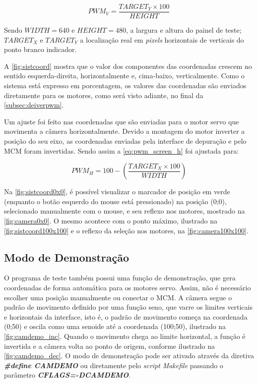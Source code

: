 \begin{equation}
	PWM_V = \frac{TARGET_Y \times 100}{HEIGHT}
	\label{eq:pwm_screen_v}
\end{equation}

Sendo $WIDTH = 640$ e $HEIGHT = 480$, a largura e altura do painel de teste; $TARGET_X$ e $TARGET_Y$ a localização real em \textit{pixels} horizontais de verticais do ponto branco indicador.

A \autoref{fig:sistcoord} mostra que o valor dos componentes das coordenadas crescem no sentido esquerda-direita, horizontalmente e, cima-baixo, verticalmente. Como o sistema está expresso em porcentagem, os valores das coordenadas são enviados diretamente para os motores, como será visto adiante, no final da \autoref{subsec:deiverpwm}.\par

Um ajuste foi feito nas coordenadas que são enviadas para o motor servo que movimenta a câmera horizontalmente. Devido a montagem do motor inverter a posição do seu eixo, as coordenadas enviadas pela interface de depuração e pelo MCM foram invertidas. Sendo assim a \autoref{eq:pwm_screen_h} foi ajustada para:

\begin{equation}
	PWM_H = 100 - (\frac{TARGET_X \times 100}{WIDTH})
	\label{eq:pwm_screen_h_inverse}
\end{equation}

Na \autoref{fig:sistcoord0x0}, é possível visualizar o marcador de posição em verde (enquanto o botão esquerdo do mouse está pressionado) na posição (0;0), selecionado manualmente com o mouse, e seu reflexo nos motores, mostrado na \autoref{fig:camera0x0}. O mesmo acontece com o ponto máximo, ilustrado na \autoref{fig:sistcoord100x100} e o reflexo da seleção nos motores, na \autoref{fig:camera100x100}.\par

\subsection{Modo de Demonstração}
\label{subsec:camdemo}

O programa de teste também possui uma função de demonstração, que gera coordenadas de forma automática para os motores servo. Assim, não é necessário escolher uma posição manualmente ou conectar o MCM. A câmera segue o padrão de movimento definido por uma função seno, que varre os limites verticais e horizontais da interface, isto é, o padrão de movimento começa na coordenada (0;50) e oscila como uma senoide até a coordenada (100;50), ilustrado na \autoref{fig:camdemo_inc}. Quando o movimento chega ao limite horizontal, a função é invertida e a câmera volta ao ponto de origem, conforme ilustrado na \autoref{fig:camdemo_dec}. O modo de demonstração pode ser ativado através da diretiva \textit{\textbf{\#define CAMDEMO}} ou diretamente pelo \textit{script} \textit{Makefile} passando o parâmetro \textbf{\textit{CFLAGS=-DCAMDEMO}}.

